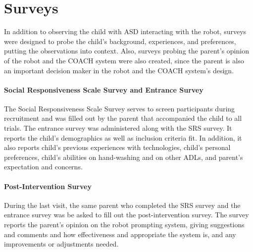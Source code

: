 \documentclass{ut-thesis}
\providecommand{\DIFaddtex}[1]{{\protect\color{blue}\uwave{#1}}} %
\providecommand{\DIFaddbegin}{} %
\providecommand{\DIFaddend}{} %
\providecommand{\DIFadd}[1]{\texorpdfstring{\DIFaddtex{#1}}{#1}} %
\begin{document}
\section{Surveys}
In addition to observing the child with ASD interacting with the robot, surveys were designed to probe the child's background, experiences, and preferences, putting the observations into context.  Also, surveys probing the parent's opinion of the robot and the COACH system were also created, since the parent is also an important decision maker in the robot and the COACH system's design.

\paragraph{Social Responsiveness Scale Survey and Entrance Survey}
The Social Responsiveness Scale Survey \DIFaddbegin \DIFadd{\mbox{%
\cite{constantino2002social} }%
}\DIFaddend serves to screen participants during recruitment and was filled out by the parent that accompanied the child to all trials.  The entrance survey was administered along with the SRS survey.  It reports the child's demographics as well as inclusion criteria fit.  In addition, it also reports child's previous experiences with technologies, child's personal preferences, child's abilities on hand-washing and on other ADLs, and parent's expectation and concerns.

\paragraph{Post-Intervention Survey}
During the last visit, the same parent who completed the SRS survey and the entrance survey was be asked to fill out the post-intervention survey.  The survey reports the parent's opinion on the robot prompting system, giving suggestions and comments and how effectiveness and appropriate the system is, and any improvements or adjustments needed.
\end{document}

